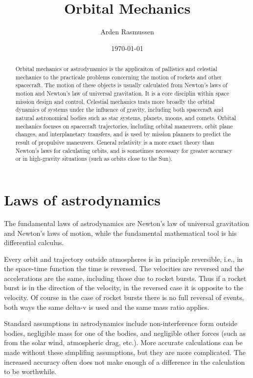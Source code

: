 \documentclass[12pt]{article}
\title{Orbital Mechanics}
\date{\today}
\author{Arden Rasmussen}
\begin{document}
\maketitle
\newpage
\begin{abstract}
  Orbital mechanics or astrodynamics is the applicaiton of pallistics and celestial mechanics to the practicale problems concerning the motion of rockets and other spacecraft. The motion of these objects is usually calculated from Newton's laws of motion and Newton's law of universal gravitation. It is a core disciplin within space mission design and control. Celestial mechanics trats more broadly the orbital dynamics of systems under the influence of gravity, including both spacecraft and natural astronomical bodies such as star systems, planets, moons, and comets. Orbital mechanics focuses on spacecraft trajectories, including orbital maneuvers, orbit plane changes, and interplanetary transfers, and is used by mission planners to predict the result of propulsive maneuvers. General relativity is a more exact theory than Newton's laws for calculating orbits, and is sometimes necessary for greater accuracy or in high-gravity situations (such as orbits close to the Sun).
\end{abstract}
\newpage
\tableofcontents
\newpage
{}

\section{Laws of astrodynamics}

The fundamental laws of astrodynamics are Newton's law of universal gravitation and Newton's laws of motion, while the fundamental mathematical tool is his differential calculus.

Every orbit and trajectory outside atmospheres is in principle reversible, i.e., in the space-time function the time is reversed. The velocities are reversed and the accelerations are the same, including those due to rocket bursts. Thus if a rocket burst is in the direction of the velocity, in the reversed case it is opposite to the velocity. Of course in the case of rocket bursts there is no full reversal of events, both ways the same delta-v is used and the same mass ratio applies.

Standard assumptions in astrodynamics include non-interference form outside bodies, negligible mass for one of the bodies, and negligible other forces (such as from the solar wind, atmospheric drag, etc.). More accurate calculations can be made without these simplifing assumptions, but they are more complicated. The increased accuracy often does not make enough of a difference in the calculation to be worthwhile.
\end{document}
